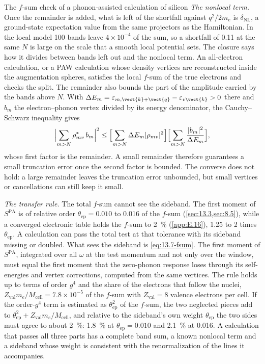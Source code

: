 \begin{workedexample}{The $f$-sum check of a phonon-assisted calculation of silicon}
\emph{The nonlocal term.} Once the remainder is added, what is left of the shortfall against $q^2/2m_e$ is $\delta_{\mathrm{NL}}$, a ground-state expectation value from the same projectors as the Hamiltonian. In the local model 100 bands leave $4\times10^{-4}$ of the sum, so a shortfall of 0.11 at the same $N$ is large on the scale that a smooth local potential sets. The closure says how it divides between bands left out and the nonlocal term. An all-electron calculation, or a PAW calculation whose density vertices are reconstructed inside the augmentation spheres, satisfies the local $f$-sum of the true electrons and checks the split. The remainder also bounds the part of the amplitude carried by the bands above $N$. With $\Delta E_m = \varepsilon_{m,\vect{k}+\vect{q}} - \varepsilon_{v\vect{k}} > 0$ there and $b_m$ the electron--phonon vertex divided by its energy denominator, the Cauchy--Schwarz inequality gives
\begin{equation*}
  \Bigl|\sum_{m>N}\rho_{mv}^*\,b_m\Bigr|^2 \le \Bigl[\sum_{m>N}\Delta E_m|\rho_{mv}|^2\Bigr]\Bigl[\sum_{m>N}\frac{|b_m|^2}{\Delta E_m}\Bigr] ,
\end{equation*}
whose first factor is the remainder. A small remainder therefore guarantees a small truncation error once the second factor is bounded. The converse does not hold: a large remainder leaves the truncation error unbounded, but small vertices or cancellations can still keep it small.

\emph{The transfer rule.} The total $f$-sum cannot see the sideband. The first moment of $S^{\mathrm{PA}}$ is of relative order $\theta_{\mathrm{ep}} = 0.010$ to 0.016 of the $f$-sum (\cref{sec:13.3,sec:8.5}), while a converged electronic table holds the $f$-sum to \SI{2}{\percent} (\cref{app:E.16}), 1.25 to 2 times $\theta_{\mathrm{ep}}$. A calculation can pass the total test at that tolerance with its sideband missing or doubled. What sees the sideband is \cref{eq:13.7-fsum}. The first moment of $S^{\mathrm{PA}}$, integrated over all $\omega$ at the test momentum and not only over the window, must equal the first moment that the zero-phonon response loses through its self-energies and vertex corrections, computed from the same vertices. The rule holds up to terms of order $g^4$ and the share of the electrons that follow the nuclei, $Z_{\mathrm{val}}m_e/M_{\mathrm{cell}} = 7.8\times10^{-5}$ of the $f$-sum with $Z_{\mathrm{val}} = 8$ valence electrons per cell. If the order-$g^4$ term is estimated as $\theta_{\mathrm{ep}}^2$ of the $f$-sum, the two neglected pieces add to $\theta_{\mathrm{ep}}^2 + Z_{\mathrm{val}}m_e/M_{\mathrm{cell}}$, and relative to the sideband's own weight $\theta_{\mathrm{ep}}$ the two sides must agree to about \SI{2}{\percent}: \SI{1.8}{\percent} at $\theta_{\mathrm{ep}} = 0.010$ and \SI{2.1}{\percent} at 0.016. A calculation that passes all three parts has a complete band sum, a known nonlocal term and a sideband whose weight is consistent with the renormalization of the lines it accompanies.
\end{workedexample}

